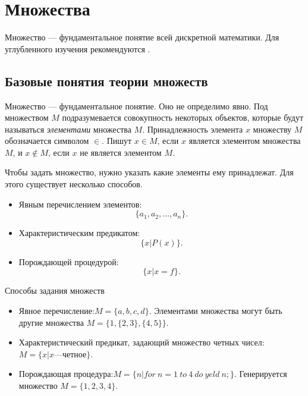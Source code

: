 \chapter{Множества} 

Множество --- фундаментальное понятие всей дискретной математики. Для углубленного изучения рекомендуются \cite{bib:sudoplatov:discrmath, bib:haggard:discrmathprogrammer, bib:novic:discrmathprogrammer}.


\section{Базовые понятия теории множеств}

Множество --- фундаментальное понятие. Оно не определимо явно. Под множеством $M$ подразумевается совокупность некоторых объектов, которые будут называться \emph{элементами} множества $M$. Принадлежность элемента $x$ множеству $M$ обозначается символом $\in$. Пишут $x\in M$, если $x$ является элементом множества $M$, и $x\not\in M$, если $x$ не является элементом $M$. 

Чтобы задать множество, нужно указать какие элементы ему принадлежат. Для этого существует несколько способов.
\begin{itemize}
    \item Явным перечислением элементов:\[\{a_1,a_2,\ldots,a_n\}.\]
    \item Характеристическим предикатом:\[\{x|P(x)\}.\]
    \item Порождающей процедурой:\[\{x|x=f\}.\]
\end{itemize}

\begin{exampl} Способы задания множеств

    \begin{itemize}
        \item Явное перечисление:$M=\{a,b,c,d\}$. Элементами множества могут быть другие множества $M=\{1,\{2,3\},\{4,5\}\}$.
        \item Характеристический предикат, задающий множество четных чисел:$M=\{x|x\text{---четное}\}$.
        \item Порождающая процедура:$M=\{n|for\ n=1\ to\ 4\ do\ yeld\ n;\}$. Генерируется множество $M=\{1,2,3,4\}$.
    \end{itemize}
\end{exampl}


